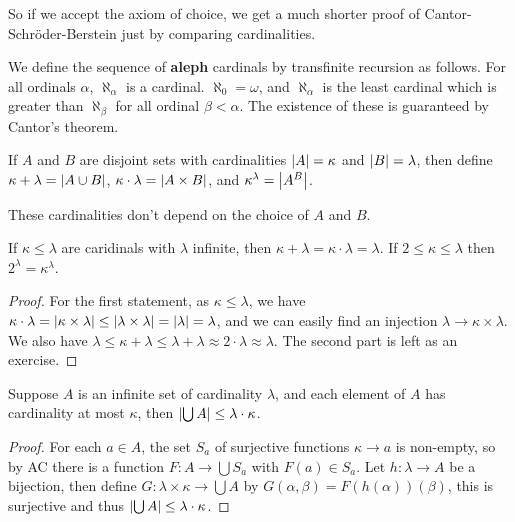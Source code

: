 \documentclass{article}
\begin{document}
So if we accept the axiom of choice, we get a much shorter proof of Cantor-Schr\"oder-Berstein just by comparing cardinalities.

\begin{definition}
    We define the sequence of \textbf{aleph} cardinals by transfinite recursion as follows. For all ordinals $\alpha$, $\aleph_\alpha$ is a cardinal. $\aleph_0 = \omega$, and $\aleph_\alpha$ is the least cardinal which is greater than $\aleph_\beta$ for all ordinal $\beta < \alpha$. The existence of these is guaranteed by Cantor's theorem.
\end{definition}

\begin{definition}
    If $A$ and $B$ are disjoint sets with cardinalities $\left| A \right| = \kappa$ and $\left| B \right| = \lambda$, then define $\kappa + \lambda = \left| A\cup B \right|$, $\kappa\cdot\lambda = \left| A\times B \right|$, and $\kappa^\lambda = \left| A^B \right|$.
\end{definition}

These cardinalities don't depend on the choice of $A$ and $B$.

\begin{theorem}
    If $\kappa\leq \lambda$ are caridinals with $\lambda$ infinite, then $\kappa + \lambda = \kappa\cdot\lambda = \lambda$. If $2\leq\kappa\leq \lambda$ then $2^\lambda = \kappa^\lambda$.
    \begin{proof}
        For the first statement, as $\kappa \leq \lambda$, we have $\kappa \cdot \lambda = \left| \kappa \times \lambda \right| \leq \left| \lambda \times \lambda \right| = \left| \lambda \right| = \lambda$, and we can easily find an injection $\lambda\rightarrow \kappa\times\lambda$. We also have $\lambda \leq \kappa + \lambda \leq \lambda + \lambda \approx 2\cdot \lambda \approx\lambda$. The second part is left as an exercise.
    \end{proof}
\end{theorem}

\begin{theorem}
    Suppose $A$ is an infinite set of cardinality $\lambda$, and each element of $A$ has cardinality at most $\kappa$, then $\left| \bigcup A \right|\leq \lambda \cdot \kappa$.\begin{proof}
        For each $a\in A$, the set $S_a$ of surjective functions $\kappa\rightarrow a$ is non-empty, so by AC there is a function $F:A\rightarrow \bigcup S_a$ with $F(a)\in S_a$. Let $h:\lambda\rightarrow A$ be a  bijection, then define $G:\lambda\times \kappa\rightarrow \bigcup A$ by $G(\alpha,\beta) = F(h(\alpha))(\beta)$, this is surjective and thus $\left| \bigcup A \right|\leq \lambda \cdot \kappa$.
    \end{proof}
\end{theorem}
\end{document}
